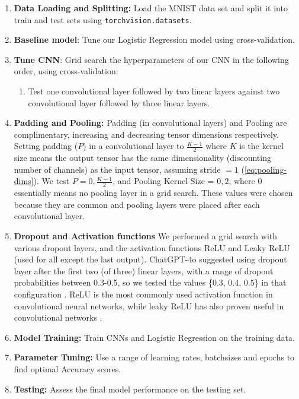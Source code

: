 \begin{enumerate}
    \item \textbf{Data Loading and Splitting:} Load the MNIST data set and split it into train and test sets using     \texttt{torchvision.datasets}. 
    \item \textbf{Baseline model}: Tune our Logistic Regression model using cross-validation.
    \item \textbf{Tune CNN}: Grid search the hyperparameters of our CNN in the following order, using cross-validation:
    \begin{enumerate}
        \item Test one convolutional layer followed by two linear layers against two convolutional layer followed by three linear layers.
    \end{enumerate}
    \item \textbf{Padding and Pooling:}
    Padding (in convolutional layers) and Pooling are complimentary, increasing and decreasing tensor dimensions respectively. Setting padding ($P$) in a convolutional layer to $\frac {K-1}2$ where $K$ is the kernel size means the output tensor has the same dimensionality (discounting number of channels) as the input tensor, assuming stride $= 1$ (\ref{eq:pooling-dims}). We test $P = 0,\frac {K-1}2$, and Pooling Kernel Size = $0,2$, where $0$ essentially means no pooling layer in a grid search. These values were chosen because they are common and pooling layers were placed after each convolutional layer.
    \item \textbf{Dropout and Activation functions}
    We performed a grid search with various dropout layers, and the activation functions ReLU and Leaky ReLU (used for all except the last output). ChatGPT-4o suggested using dropout layer after the first two (of three) linear layers, with a range of dropout probabilities between 0.3-0.5, so we  tested the values \{0.3, 0.4, 0.5\} in that configuration \cite{openai2023chatgpt}.  ReLU is the most commonly used activation function in convolutional neural networks, while leaky ReLU has also proven useful in convolutional networks \cite {activation_functions}.
    \item \textbf{Model Training:} Train CNNs and Logistic Regression on the training data.
    \item \textbf{Parameter Tuning:} Use a range of learning rates, batchsizes and epochs to find optimal Accuracy scores. 
    \item \textbf{Testing:} Assess the final model performance on the testing set.
\end{enumerate}


